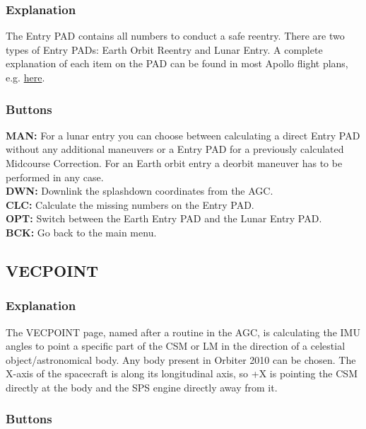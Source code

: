 \documentclass[11pt]{article} %
\begin{document}
\subsubsection{Explanation}

The Entry PAD contains all numbers to conduct a safe reentry. There are two types of Entry PADs: Earth Orbit Reentry and Lunar Entry. A complete explanation of each item on the PAD can be found in most Apollo flight plans, e.g. \href{http://history.nasa.gov/alsj/a11/a11fltpln_final_reformat.pdf}{here}. \\

\subsubsection{Buttons}

\textbf{MAN:} For a lunar entry you can choose between calculating a direct Entry PAD without any additional maneuvers or a Entry PAD for a previously calculated Midcourse Correction. For an Earth orbit entry a deorbit maneuver has to be performed in any case.\\
\textbf{DWN:} Downlink the splashdown coordinates from the AGC.\\
\textbf{CLC:} Calculate the missing numbers on the Entry PAD.\\
\textbf{OPT:} Switch between the Earth Entry PAD and the Lunar Entry PAD.\\
\textbf{BCK:} Go back to the main menu.\\

\subsection{VECPOINT}

\subsubsection{Explanation}

The VECPOINT page, named after a routine in the AGC, is calculating the IMU angles to point a specific part of the CSM or LM in the direction of a celestial object/astronomical body. Any body present in Orbiter 2010 can be chosen. The X-axis of the spacecraft is along its longitudinal axis, so +X is pointing the CSM directly at the body and the SPS engine directly away from it.\\

\subsubsection{Buttons}
\end{document}
